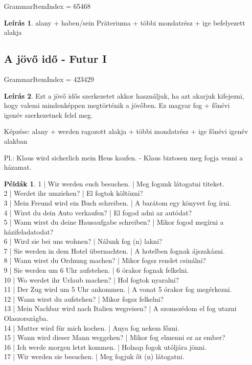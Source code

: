 \documentclass{article}
\theoremstyle{definition}
\newtheorem*{exmp}{Példák}
\newtheorem*{desc}{Leírás}
\begin{document}
GrammarItemIndex = 65468

\begin{desc}
alany + haben/sein Präteriuma + többi mondatrész + ige befelyezett alakja
\end{desc}


\subsection{A jövő idő - Futur I}

GrammarItemIndex = 423429

\begin{desc}
Ezt a jövő idős szerkezetet akkor használjuk, ha azt akarjuk kifejezni, hogy valemi mindenképpen megtörténik a jövőben. Ez magyar fog + főnévi igenév szerkezetnek felel meg.

Képzése: alany + werden ragozott alakja + többi mondatrész + ige főnévi igenév alakban

Pl.: Klaus wird sicherlich mein Heus kaufen. - Klaus biztosen meg fogja venni a házamat.
\end{desc}

\begin{exmp}
1 | Wir werden euch besuchen. | Meg fogunk látogatni titeket.\\
2 | Werdet ihr umziehen? | El fogtok költözni?\\
3 | Mein Freund wird ein Buch schreiben. | A barátom egy könyvet fog írni.\\
4 | Wirst du dein Auto verkaufen? | El fogod adni az autódat?\\
5 | Wann wirst du deine Hausaufgabe schreiben? | Mikor fogod megírni a házifeladatodat?\\
6 | Wird sie bei uns wohnen? | Nálunk fog (n) lakni?\\
7 | Sie werden in dem Hotel übernachten. | A hotelben fognak ájszakázni.\\
8 | Wann wirst du Ordnung machen? | Mikor fogsz rendet csinálni?\\
9 | Sie werden um 6 Uhr aufstehen. | 6 órakor fognak felkelni.\\
10 | Wo werdet ihr Urlaub machen? | Hol fogtok nyaralni?\\
11 | Der Zug wird um 5 Uhr ankommen. | A vonat 5 órakor fog megérkezni.\\
12 | Wann wirst du aufstehen? | Mikor fogsz felkelni?\\
13 | Mein Nachbar wird nach Italien wegreisen? | A szomszédom el fog utazni Olaszországba.\\
14 | Mutter wird für mich kochen. | Anya fog nekem főzni.\\
15 | Wann wird dieser Mann weggehen? | Mikor fog elmenni ez az ember?\\
16 | Ich werde morgen letzt kommen. | Holnap fogok utóljára jönni.\\
17 | Wir werden sie besuchen. | Meg fogjuk őt (n) látogatni.\\
\end{exmp}
\end{document}

